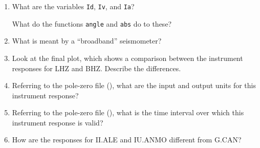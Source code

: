 \documentclass[11pt,titlepage,fleqn]{article}
\begin{document}
\begin{enumerate}

\item What are the variables \verb+Id+, \verb+Iv+, and \verb+Ia+?

What do the functions \verb+angle+ and \verb+abs+ do to these?

\item What is meant by a ``broadband'' seismometer?

\item Look at the final plot, which shows a comparison between the instrument responses for LHZ and BHZ. Describe the differences.

\item Referring to the pole-zero file (), what are the input and output units for this instrument response?

\item Referring to the pole-zero file (), what is the time interval over which this instrument response is valid?

\item How are the responses for II.ALE and IU.ANMO different from G.CAN?

\end{enumerate}


\iffalse
\section{Deconvolve instrument response for a seismogram}

FUTURE PART OF THE LAB (see also \verb+lab_sumatra.pdf+):
%
\begin{verbatim}
otime = 2004-12-26 00:58:50 = 732307.040856 [matlab days]
station CAN.G
duration = 10 days
start time: t1 = otime - duration - 1
end time: t2 = t1 + duration
channels: LHZ, LHE, LHN

Deconvolve instrument response on all three components.
Plot the amplitude spectrum over 0.2--1.0 mHz to show the gravest mode peaks.
Show what the main arrival looks like at bandpass 50-500s with and without decon.
Rotate to R and T to isolate SH waves.
[Having the previous 10 days allows for the noise analysis in hw_sumatraA.pdf]
\end{verbatim}
\fi


\end{document}

